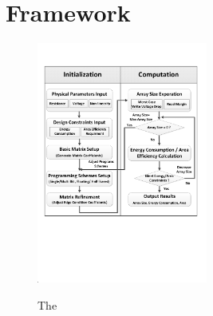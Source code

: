 \vspace{10pt}
\section{Framework}\label{sec:framwork} \begin{figure}%
\centering
  \includegraphics[width=0.5\textwidth]{./figures/FlowChart.pdf}\\
  \caption{The}\label{fig:FlowChart}
\end{figure} 
